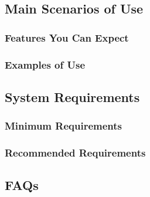 	
	\subsection{Main Scenarios of Use}
		
		\subsubsection{Features You Can Expect}
		
		\subsubsection{Examples of Use}
	
	\subsection{System Requirements}
		
		\subsubsection{Minimum Requirements}
		
		\subsubsection{Recommended Requirements}
	
	\subsection{FAQs}